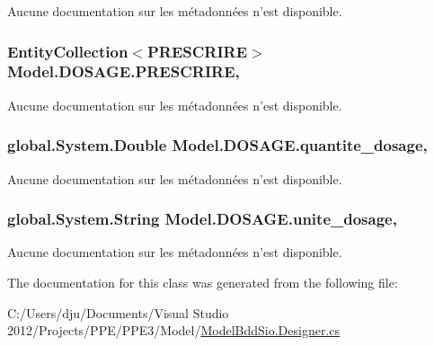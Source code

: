 Aucune documentation sur les métadonnées n'est disponible. 

\hypertarget{class_model_1_1_d_o_s_a_g_e_a98f3391689994e603d1b4e97b3e29f61}{
\subsubsection[{P\-R\-E\-S\-C\-R\-I\-R\-E}]{\setlength{\rightskip}{0pt plus 5cm}Entity\-Collection$<${\bf P\-R\-E\-S\-C\-R\-I\-R\-E}$>$ Model.\-D\-O\-S\-A\-G\-E.\-P\-R\-E\-S\-C\-R\-I\-R\-E\hspace{0.3cm}{\ttfamily [get]}, {\ttfamily [set]}}}\label{class_model_1_1_d_o_s_a_g_e_a98f3391689994e603d1b4e97b3e29f61}


Aucune documentation sur les métadonnées n'est disponible. 

\hypertarget{class_model_1_1_d_o_s_a_g_e_ac3bf6f580f1ebe8e492def33d2b8bcbc}{
\subsubsection[{quantite\-\_\-dosage}]{\setlength{\rightskip}{0pt plus 5cm}global.\-System.\-Double Model.\-D\-O\-S\-A\-G\-E.\-quantite\-\_\-dosage\hspace{0.3cm}{\ttfamily [get]}, {\ttfamily [set]}}}\label{class_model_1_1_d_o_s_a_g_e_ac3bf6f580f1ebe8e492def33d2b8bcbc}


Aucune documentation sur les métadonnées n'est disponible. 

\hypertarget{class_model_1_1_d_o_s_a_g_e_a3404cd2f5d068ae264fd6848e4baf4e5}{
\subsubsection[{unite\-\_\-dosage}]{\setlength{\rightskip}{0pt plus 5cm}global.\-System.\-String Model.\-D\-O\-S\-A\-G\-E.\-unite\-\_\-dosage\hspace{0.3cm}{\ttfamily [get]}, {\ttfamily [set]}}}\label{class_model_1_1_d_o_s_a_g_e_a3404cd2f5d068ae264fd6848e4baf4e5}


Aucune documentation sur les métadonnées n'est disponible. 



The documentation for this class was generated from the following file\-:\begin{DoxyCompactItemize}
\item 
C\-:/\-Users/dju/\-Documents/\-Visual Studio 2012/\-Projects/\-P\-P\-E/\-P\-P\-E3/\-Model/\hyperlink{_model_bdd_sio_8_designer_8cs}{Model\-Bdd\-Sio.\-Designer.\-cs}\end{DoxyCompactItemize}
